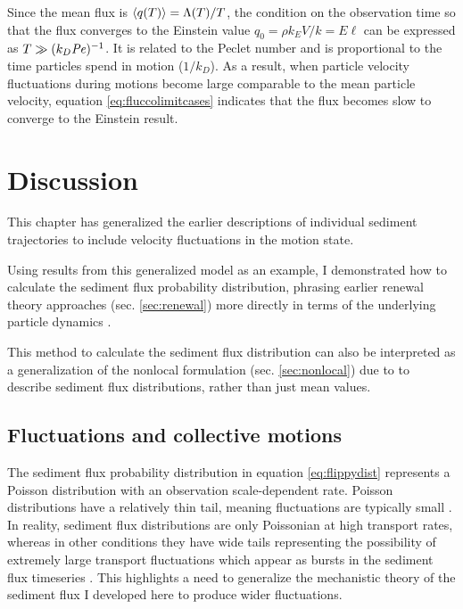 Since the mean flux is $\langle q(T) \rangle = \Lambda(T)/T$, the condition on the observation time so that the flux converges to the Einstein value $q_0 = \rho k_E V/k = E \ell$ can be expressed as $T\gg (k_D \mbox{\textit{Pe}})^{-1}$. It is related to the Peclet number and is proportional to the time particles spend in motion ($1/k_D$). As a result, when particle velocity fluctuations during motions become large comparable to the mean particle velocity, equation \ref{eq:fluccolimitcases} indicates that the flux becomes slow to converge to the Einstein result.

\section{Discussion \label{sec:disc}}

This chapter has generalized the earlier descriptions of individual sediment trajectories \citep[e.g.][]{Lisle1998,Lajeunesse2017} to include velocity fluctuations in the motion state.

Using results from this generalized model as an example, I demonstrated how to calculate the sediment flux probability distribution, phrasing earlier renewal theory approaches (sec. \ref{sec:renewal}) more directly in terms of the underlying particle dynamics \citep[e.g.][]{Turowski2010,Ancey2020}.

This method to calculate the sediment flux distribution can also be interpreted as a generalization of the nonlocal formulation (sec. \ref{sec:nonlocal}) due to \citet{Parker2000,Furbish2012a} to describe sediment flux distributions, rather than just mean values.

\subsection{Fluctuations and collective motions}

The sediment flux probability distribution in equation \ref{eq:flippydist} represents a Poisson distribution with an observation scale-dependent rate.
Poisson distributions have a relatively thin tail, meaning fluctuations are typically small \citep{Ancey2006}.
In reality, sediment flux distributions are only Poissonian at high transport rates, whereas in other conditions they have wide tails representing the possibility of extremely large transport fluctuations \citep{Ancey2008,Turowski2010,Dhont2018,Saletti2015} which appear as bursts \citep[e.g.][]{Goh2008} in the sediment flux timeseries \citep{Singh2009, Heyman2013,Benavides2021}. 
This highlights a need to generalize the mechanistic theory of the sediment flux I developed here to produce wider fluctuations.

